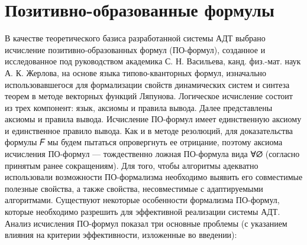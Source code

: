 \section{Позитивно-образованные формулы}
В качестве теоретического базиса разработанной системы АДТ выбрано исчисление позитивно-образованных формул (ПО-формул), созданное и исследованное под руководством академика С. Н. Васильева, канд. физ.-мат. наук А. К. Жерлова, на основе языка типово-кванторных формул, изначально использовавшегося для формализации свойств динамических систем и синтеза теорем в методе векторных функций Ляпунова.
Логическое исчисление состоит из трех компонент: язык, аксиомы и правила вывода. Далее представлены аксиомы и правила вывода. 
Исчисление ПО-формул имеет единственную аксиому и единственное правило вывода. Как и в методе резолюций, для доказательства формулы 𝐹 мы будем пытаться опровергнуть ее отрицание, поэтому аксиома исчисления ПО-формул — тождественно ложная ПО-формула вида ∀∅ (согласно принятым ранее сокращениям).
Для того, чтобы алгоритмы адекватно использовали возможности ПО-формализма необходимо выявить его совместимые полезные свойства, а также свойства, несовместимые с адаптируемыми алгоритмами. 
Существуют некоторые особенности формализма ПО-формул, которые необходимо разрешить для эффективной реализации системы АДТ. Анализ исчисления ПО-формул показал три основные проблемы (с указанием влияния на критерии эффективности, изложенные во введении):

